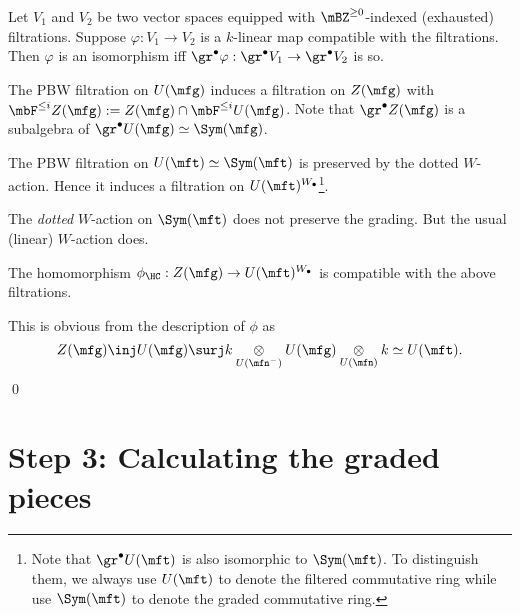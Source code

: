 	\begin{facts}
		Let $V_1$ and $V_2$ be two vector spaces equipped with $\mBZ^{\ge 0}$-indexed (exhausted) filtrations. Suppose $\varphi:V_1\to V_2$ is a $k$-linear map compatible with the filtrations. Then $\varphi$ is an isomorphism iff $\gr^\bullet \varphi: \gr^\bullet V_1 \to \gr^\bullet V_2$ is so.
	\end{facts}

	\begin{constr}
		The PBW filtration on $U(\mfg)$ induces a filtration on $Z(\mfg)$ with $\mbF^{\le i} Z(\mfg):= Z(\mfg)\cap \mbF^{\le i}U(\mfg)$. Note that $\gr^\bullet Z(\mfg)$ is a subalgebra of $\gr^\bullet U(\mfg) \simeq \Sym(\mfg)$.
	\end{constr}

	\begin{constr}
		The PBW filtration on $U(\mft)\simeq \Sym(\mft)$ is preserved by the dotted $W$-action. Hence it induces a filtration on $U(\mft)^{W_\bullet}$\footnote{Note that $\gr^\bullet U(\mft)$ is also isomorphic to $\Sym(\mft)$. To distinguish them, we always use $U(\mft)$ to denote the filtered commutative ring while use $\Sym(\mft)$ to denote the graded commutative ring.}.
	\end{constr}

	\begin{warn}
		The \emph{dotted} $W$-action on $\Sym(\mft)$ does not preserve the grading. But the usual (linear) $W$-action does.
	\end{warn}

	\begin{lem}
		The homomorphism $\phi_\HC: Z(\mfg) \to U(\mft)^{W_\bullet}$ is compatible with the above filtrations.
	\end{lem}

	\proof
		This is obvious from the description of $\phi$ as
		\[
			Z(\mfg) \inj U(\mfg) \surj k\ot_{U(\mfn^-)} U(\mfg) \ot_{U(\mfn)} k \simeq U(\mft).
		\]
	\qed

\section{Step 3: Calculating the graded pieces}
	
